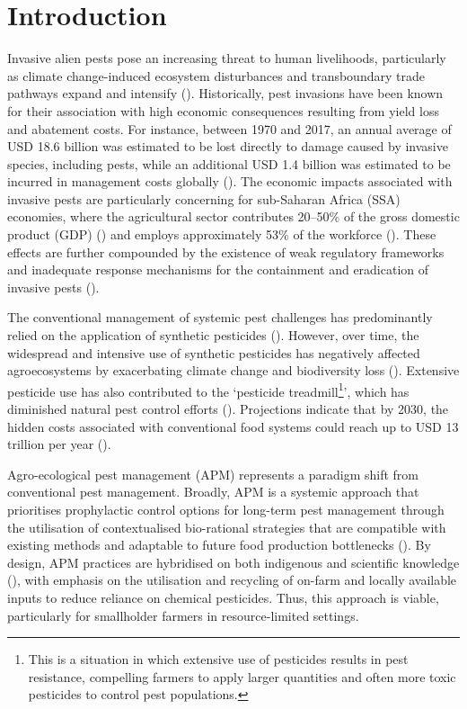 \documentclass[fleqn,twoside,reqno]{article}
\begin{document}
\section{Introduction}\label{sec:1}
\fontsize{12}{14}\selectfont %
Invasive alien pests pose an increasing threat to human livelihoods, particularly as climate change-induced ecosystem disturbances and transboundary trade pathways expand and intensify (\cite{Early2016, Skendzic2021}). Historically, pest invasions have been known for their association with high economic consequences resulting from yield loss and abatement costs. For instance, between 1970 and 2017, an annual average of USD 18.6 billion was estimated to be lost directly to damage caused by invasive species, including pests, while an additional USD 1.4 billion was estimated to be incurred in management costs globally (\cite{Diagne2021}). The economic impacts associated with invasive pests are particularly concerning for sub-Saharan Africa (SSA) economies, where the agricultural sector contributes 20--50\% of the gross domestic product (GDP) (\cite{Giller2020}) and employs approximately 53\% of the workforce (\cite{Srinivasan2022}). These effects are further compounded by the existence of weak regulatory frameworks and inadequate response mechanisms for the containment and eradication of invasive pests (\cite{Ndlela2022}).

The conventional management of systemic pest challenges has predominantly relied on the application of synthetic pesticides (\cite{Schreinemachers2017}). However, over time, the widespread and intensive use of synthetic pesticides has negatively affected agroecosystems by exacerbating climate change and biodiversity loss (\cite{Heimpel2013, Skendzic2021}). Extensive pesticide use has also contributed to the ‘pesticide treadmill\footnote{This is a situation in which extensive use of pesticides results in pest resistance, compelling farmers to apply larger quantities and often more toxic pesticides to control pest populations.}’, which has diminished natural pest control efforts (\cite{Bakker2020}). Projections indicate that by 2030, the hidden costs associated with conventional food systems could reach up to USD 13 trillion per year (\cite{Rockstrom2020}).

Agro-ecological pest management (APM) represents a paradigm shift from conventional pest management. Broadly, APM is a systemic approach that prioritises prophylactic control options for long-term pest management through the utilisation of contextualised bio-rational strategies that are compatible with existing methods and adaptable to future food production bottlenecks (\cite{Belmain2022}). By design, APM practices are hybridised on both indigenous and scientific knowledge (\cite{Deguine2021, Wezel2009}), with emphasis on the utilisation and recycling of on-farm and locally available inputs to reduce reliance on chemical pesticides. Thus, this approach is viable, particularly for smallholder farmers in resource-limited settings.
\end{document}
